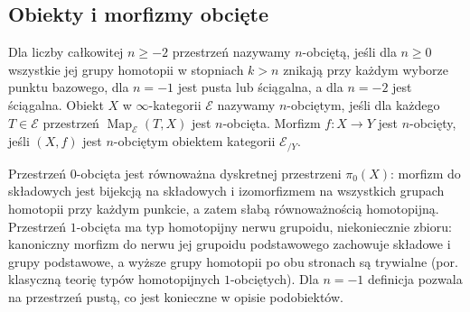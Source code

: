 \subsection{Obiekty i morfizmy obcięte}

\begin{definicja}\label{cat:def:infty-topos-truncated}
Dla liczby całkowitej $n\geq-2$ przestrzeń nazywamy $n$-obciętą, jeśli dla $n\geq0$ wszystkie jej grupy homotopii w stopniach $k>n$ znikają przy każdym wyborze punktu bazowego, dla $n=-1$ jest pusta lub ściągalna, a dla $n=-2$ jest ściągalna. Obiekt $X$ w $\infty$-kategorii $\mathcal E$ nazywamy $n$-obciętym, jeśli dla każdego $T\in\mathcal E$ przestrzeń $\operatorname{Map}_{\mathcal E}(T,X)$ jest $n$-obcięta. Morfizm $f:X\to Y$ jest $n$-obcięty, jeśli $(X,f)$ jest $n$-obciętym obiektem kategorii $\mathcal E_{/Y}$.
\end{definicja}

Przestrzeń $0$-obcięta jest równoważna dyskretnej przestrzeni $\pi_0(X)$: morfizm do składowych jest bijekcją na składowych i izomorfizmem na wszystkich grupach homotopii przy każdym punkcie, a zatem słabą równoważnością homotopijną. Przestrzeń $1$-obcięta ma typ homotopijny nerwu grupoidu, niekoniecznie zbioru: kanoniczny morfizm do nerwu jej grupoidu podstawowego zachowuje składowe i grupy podstawowe, a wyższe grupy homotopii po obu stronach są trywialne (por. klasyczną teorię typów homotopijnych $1$-obciętych). Dla $n=-1$ definicja pozwala na przestrzeń pustą, co jest konieczne w opisie podobiektów.

